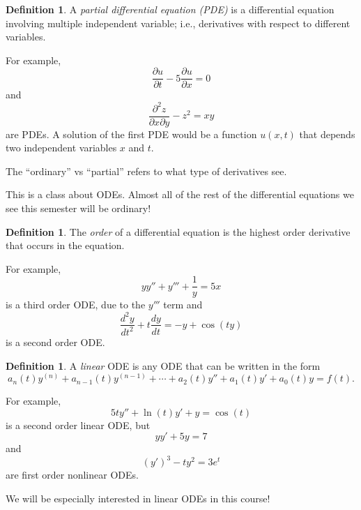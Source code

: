 \documentclass[12pt]{amsart}
\numberwithin{equation}{section}
\theoremstyle{plain} %
\theoremstyle{definition}
\newtheorem{defn}[equation]{Definition}
\theoremstyle{remark}
\begin{document}
\begin{defn} A \emph{partial differential equation (PDE)} is a differential equation involving multiple independent variable; i.e., derivatives with respect to different variables.
\end{defn}
For example, 
\[ \frac{\partial u}{\partial t} - 5 \frac{\partial u}{\partial x} = 0\]
and 
\[ \frac{\partial^2 z}{\partial x \partial y} -z^2 = xy\]
are PDEs. A solution of the first PDE would be a function $u(x,t)$ that depends two independent variables $x$ and $t$.
 
The ``ordinary'' vs ``partial'' refers to what type of derivatives see. 

This is a class about ODEs. Almost all of the rest of the differential equations we see this semester will be ordinary!


\begin{defn} The \emph{order} of a differential equation is the highest order derivative that occurs in the equation.
\end{defn}

For example,
\[ y y'' +  y''' + \frac{1}{y} = 5x\]
is a third order ODE, due to the $y'''$ term and
 \[ \frac{d^2 y}{dt^2} + t \frac{dy}{dt} = -y + \cos(ty)\]
 is a second order ODE.
 
 \begin{defn} A \emph{linear} ODE is any ODE that can be written in the form
 \[ a_n(t) y^{(n)} + a_{n-1}(t) y^{(n-1)} + \cdots + a_2(t) y'' + a_1(t) y' + a_0(t) y = f(t).\]
 \end{defn}
 For example,
 \[ 5t y'' + \ln(t) y' + y = \cos(t)\]
 is a second order linear ODE, but 
 \[ y y' + 5y = 7\]
 and 
 \[ (y')^3 - t y^2 = 3 e^t\]
are first order nonlinear ODEs.

We will be especially interested in linear ODEs in this course!

 
\end{document}
